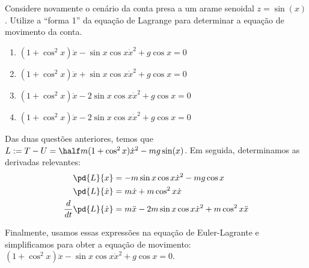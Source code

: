 \begin{question}
    Considere novamente o cenário da conta presa a um arame senoidal $z = \sin(x)$.
    Utilize a ``forma 1'' da equação de Lagrange para determinar a equação de movimento da conta.
    \begin{enumerate}
      \item $(1 + \cos^2 x)\ddot x - \sin x\cos x \dot x^2 + g\cos x = 0$ \rightanswer
      \item $(1 + \cos^2 x)\ddot x + \sin x\cos x \dot x^2 + g\cos x = 0$
      \item $(1 + \cos^2 x)\ddot x - 2\sin x\cos x \dot x^2 + g\cos x = 0$
      \item $(1 + \cos^2 x)\ddot x - 2\sin x\cos x \dot x^2 + g\cos x = 0$
    \end{enumerate}

    \begin{solution}
      Das duas questões anteriores, temos que $L := T - U = \half m (1 + \cos^2 x) \dot x^2 - mg\sin(x)$.
      Em seguida, determinamos as derivadas relevantes:
      \begin{align*}
        \pd{L}{x} &= -m\sin x\cos x \dot x^2 - mg \cos x\\
        \pd{L}{\dot x} &= m\dot x + m\cos^2 x\dot x \\
        \frac{d}{dt}\pd{L}{\dot x} &= m\ddot x - 2m\sin x\cos x\dot x^2 + m\cos^2 x\ddot x
      \end{align*}

      Finalmente, usamos essas expressões na equação de Euler-Lagrante e simplificamos para obter a equação de movimento: $(1 + \cos^2 x)\ddot x - \sin x\cos x \dot x^2 + g\cos x = 0$.
    \end{solution}
\end{question}
